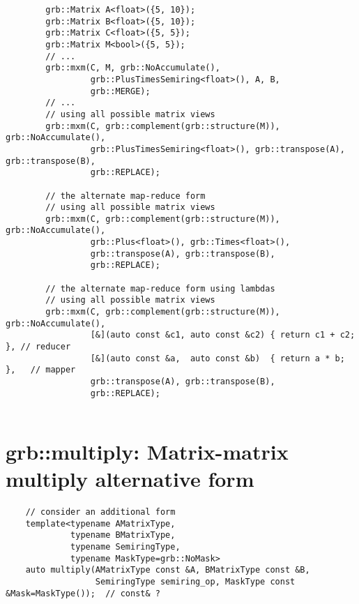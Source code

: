 \begin{verbatim}
        grb::Matrix A<float>({5, 10});
        grb::Matrix B<float>({5, 10});
        grb::Matrix C<float>({5, 5});
        grb::Matrix M<bool>({5, 5});
        // ...
        grb::mxm(C, M, grb::NoAccumulate(), 
                 grb::PlusTimesSemiring<float>(), A, B,
                 grb::MERGE);
        // ...
        // using all possible matrix views
        grb::mxm(C, grb::complement(grb::structure(M)), grb::NoAccumulate(), 
                 grb::PlusTimesSemiring<float>(), grb::transpose(A), grb::transpose(B),
                 grb::REPLACE);

        // the alternate map-reduce form
        // using all possible matrix views
        grb::mxm(C, grb::complement(grb::structure(M)), grb::NoAccumulate(), 
                 grb::Plus<float>(), grb::Times<float>(),
                 grb::transpose(A), grb::transpose(B),
                 grb::REPLACE);

        // the alternate map-reduce form using lambdas
        // using all possible matrix views
        grb::mxm(C, grb::complement(grb::structure(M)), grb::NoAccumulate(), 
                 [&](auto const &c1, auto const &c2) { return c1 + c2; }, // reducer
                 [&](auto const &a,  auto const &b)  { return a * b; },   // mapper
                 grb::transpose(A), grb::transpose(B),
                 grb::REPLACE);
                
\end{verbatim}

\section{{\sf grb::multiply}: Matrix-matrix multiply alternative form}

\paragraph{\syntax}

\begin{verbatim}
    // consider an additional form
    template<typename AMatrixType,
             typename BMatrixType,
             typename SemiringType,
             typename MaskType=grb::NoMask>
    auto multiply(AMatrixType const &A, BMatrixType const &B,
                  SemiringType semiring_op, MaskType const &Mask=MaskType());  // const& ?
\end{verbatim}



